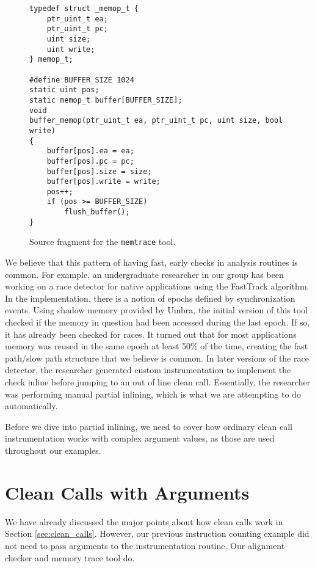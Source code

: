 \begin{figure}
\begin{verbatim}
typedef struct _memop_t {
    ptr_uint_t ea;
    ptr_uint_t pc;
    uint size;
    uint write;
} memop_t;

#define BUFFER_SIZE 1024
static uint pos;
static memop_t buffer[BUFFER_SIZE];
void
buffer_memop(ptr_uint_t ea, ptr_uint_t pc, uint size, bool write)
{
    buffer[pos].ea = ea;
    buffer[pos].pc = pc;
    buffer[pos].size = size;
    buffer[pos].write = write;
    pos++;
    if (pos >= BUFFER_SIZE)
        flush_buffer();
}
\end{verbatim}
\caption{Source fragment for the {\tt memtrace} tool.}
\label{fig:memtrace_src}
\end{figure}

We believe that this pattern of having fast, early checks in analysis routines
is common.  For example, an undergraduate researcher in our group has been
working on a race detector for native applications using the FastTrack
algorithm\cite{fasttrack}.  In the implementation, there is a notion of epochs
defined by synchronization events.  Using shadow memory provided by
Umbra\cite{umbra}, the initial version of this tool checked if the memory in
question had been accessed during the last epoch.  If so, it has already been
checked for races.  It turned out that for most applications memory was reused
in the same epoch at least 50\% of the time, creating the fast path/slow path
structure that we believe is common.  In later versions of the race detector,
the researcher generated custom instrumentation to implement the check inline
before jumping to an out of line clean call.  Essentially, the researcher was
performing manual partial inlining, which is what we are attempting to do
automatically.

Before we dive into partial inlining, we need to cover how ordinary clean call
instrumentation works with complex argument values, as those are used throughout
our examples.

\section{Clean Calls with Arguments}

We have already discussed the major points about how clean calls work in Section
\ref{sec:clean_calls}.  However, our previous instruction counting example did
not need to pass arguments to the instrumentation routine.  Our alignment
checker and memory trace tool do.

